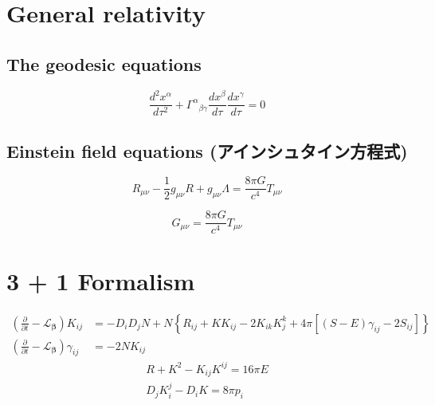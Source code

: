 %
%
%
%
%
\section{General relativity}



%
%
\subsection{The geodesic equations}
\begin{equation}
  \frac{d^2 x^\alpha }{d\tau^2} + {\Gamma^\alpha }_{\beta \gamma } \frac{dx^\beta }{d\tau } \frac{dx^\gamma }{d\tau } = 0
\end{equation}


%
%
\subsection{Einstein field equations (アインシュタイン方程式)}
\begin{equation}
  R_{\mu \nu } - \frac{1}{2} g_{\mu \nu }R + g_{\mu \nu }\Lambda = \frac{8\pi G}{c^4} T_{\mu \nu }
\end{equation}

\begin{equation}
  G_{\mu \nu } = \frac{8\pi G}{c^4} T_{\mu \nu }
\end{equation}



%
%
%
%
%
\section{3 + 1 Formalism}



%
%
\begin{align}
  \left( \frac{\partial}{\partial t} - {\mathcal L}_{\boldsymbol \beta} \right) K_{ij}
    & = -D_iD_j N + N \left\{ R_{ij} + KK_{ij} - 2K_{ik} K^k_j + 4\pi \left[ \left( S-E \right) \gamma_{ij} - 2S_{ij} \right] \right\} \\
  \left( \frac{\partial}{\partial t} - {\mathcal L}_{\boldsymbol \beta} \right) \gamma_{ij}
    & = -2NK_{ij}
\end{align}
\begin{gather}
  R + K^2 - K_{ij} K^{ij} = 16\pi E \\
  D_j K^j_i - D_i K = 8\pi p_i
\end{gather}
